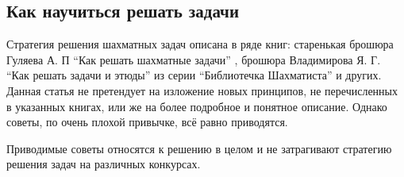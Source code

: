\subsection*{Как научиться решать задачи}
\markright{}

Стратегия решения шахматных задач описана в ряде книг: старенькая брошюра Гуляева А. П ``Как решать шахматные задачи'' \cite{Guleaev}, брошюра Владимирова Я. Г. ``Как решать задачи и этюды'' из серии ``Библиотечка Шахматиста'' \cite{Vladimirov} и других. Данная статья не претендует на изложение новых принципов, не перечисленных в указанных книгах, или же на более подробное и понятное описание. Однако советы, по очень плохой привычке, всё равно приводятся.

Приводимые советы относятся к решению в целом и не затрагивают стратегию решения задач на различных конкурсах.

